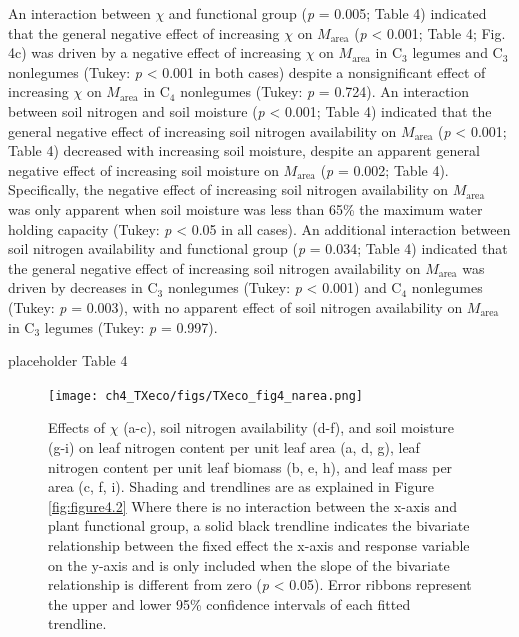 An interaction between $\chi$ and functional group (\textit{p} = 0.005; Table 4) indicated that the general negative effect of increasing $\chi$ on $M_\mathrm{area}$ (\textit{p} < 0.001; Table 4; Fig. 4c) was driven by a negative effect of increasing $\chi$ on $M_\mathrm{area}$ in C$_3$ legumes and C$_3$ nonlegumes (Tukey: \textit{p} < 0.001 in both cases) despite a nonsignificant effect of increasing $\chi$ on $M_\mathrm{area}$ in C$_4$ nonlegumes (Tukey: \textit{p} = 0.724). An interaction between soil nitrogen and soil moisture (\textit{p} < 0.001; Table 4) indicated that the general negative effect of increasing soil nitrogen availability on $M_\mathrm{area}$ (\textit{p} < 0.001; Table 4) decreased with increasing soil moisture, despite an apparent general negative effect of increasing soil moisture on $M_\mathrm{area}$ (\textit{p} = 0.002; Table 4). Specifically, the negative effect of increasing soil nitrogen availability on $M_\mathrm{area}$ was only apparent when soil moisture was less than 65\% the maximum water holding capacity (Tukey: \textit{p} < 0.05 in all cases). An additional interaction between soil nitrogen availability and functional group (\textit{p} = 0.034; Table 4) indicated that the general negative effect of increasing soil nitrogen availability on $M_\mathrm{area}$ was driven by decreases in C$_3$ nonlegumes (Tukey: \textit{p} < 0.001) and C$_4$ nonlegumes (Tukey: \textit{p} = 0.003), with no apparent effect of soil nitrogen availability on $M_\mathrm{area}$ in C$_3$ legumes (Tukey: \textit{p} = 0.997).

\newpage
placeholder Table 4
\clearpage

\newpage
\begin{landscape}
    \begin{figure}
        \centering
        \texttt{[image: ch4\_TXeco/figs/TXeco\_fig4\_narea.png]}
        \caption[Effects of $\chi$, soil nitrogen availability, and soil moisture on leaf nitrogen content per unit leaf area, leaf nitrogen content per unit leaf biomass, and leaf mass per area.]{Effects of $\chi$ (a-c), soil nitrogen availability (d-f), and soil moisture (g-i) on leaf nitrogen content per unit leaf area (a, d, g), leaf nitrogen content per unit leaf biomass (b, e, h), and leaf mass per area (c, f, i). Shading and trendlines are as explained in Figure \ref{fig:figure4.2}
        Where there is no interaction between the x-axis and plant functional group, a solid black trendline indicates the bivariate relationship between the fixed effect the x-axis and response variable on the y-axis and is only included when the slope of the bivariate relationship is different from zero (\textit{p} < 0.05). Error ribbons represent the upper and lower 95\% confidence intervals of each fitted trendline.}
        \label{fig:figure4.4}
    \end{figure}
\end{landscape}
\clearpage

